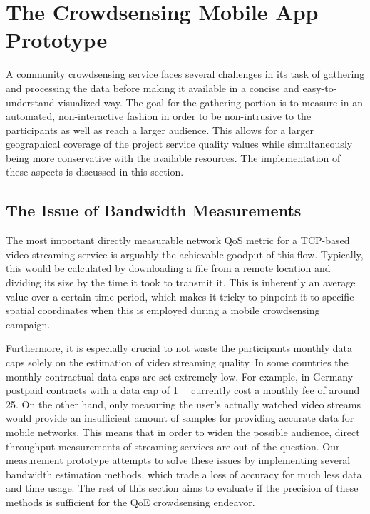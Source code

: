 \section{The Crowdsensing Mobile App Prototype}
\label{sec:prototype}

A community crowdsensing service faces several challenges in its task of gathering and processing the data before making it available in a concise and easy-to-understand visualized way. The goal for the gathering portion is to measure in an automated, non-interactive fashion in order to be non-intrusive to the participants as well as reach a larger audience. This allows for a larger geographical coverage of the project service quality values while simultaneously being more conservative with the available resources. The implementation of these aspects is discussed in this section.


\subsection{The Issue of Bandwidth Measurements}
\label{sec:BWest}

The most important directly measurable network \gls{QoS} metric for a \acrshort{TCP}-based video streaming service is arguably the achievable goodput of this flow. Typically, this would be calculated by downloading a file from a remote location and dividing its size by the time it took to transmit it. This is inherently an average value over a certain time period, which makes it tricky to pinpoint it to specific spatial coordinates when this is employed during a mobile crowdsensing campaign.

Furthermore, it is especially crucial to not waste the participants monthly data caps solely on the estimation of video streaming quality. In some countries the monthly contractual data caps are set extremely low. For example, in Germany postpaid contracts with a data cap of \SI{1}{\giga\byte} currently cost a monthly fee of around \SI{25}{\EUR}. On the other hand, only measuring the user's actually watched video streams would provide an insufficient amount of samples for providing accurate data for mobile networks. This means that in order to widen the possible audience, direct throughput measurements of streaming services are out of the question. Our measurement prototype attempts to solve these issues by implementing several bandwidth estimation methods, which trade a loss of accuracy for much less data and time usage. The rest of this section aims to evaluate if the precision of these methods is sufficient for the \gls{QoE} crowdsensing endeavor.


